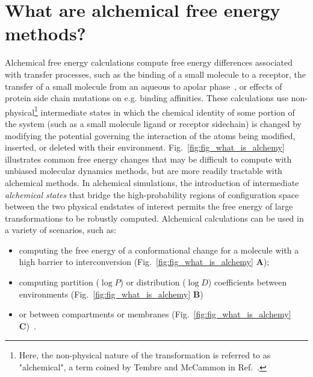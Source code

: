 \documentclass[9pt,bestpractices]{livecoms}
\begin{document}
\section{What are alchemical free energy methods?}
\label{sec:intro}
Alchemical free energy calculations compute free energy differences associated with transfer processes, such as the binding of a small molecule to a receptor, the transfer of a small molecule from an aqueous to apolar phase~\cite{zwanzig1954hightemperature}, or effects of protein side chain mutations on e.g. binding affinities. 
These calculations use non-physical\footnote{Here, the non-physical nature of the transformation is referred to as "alchemical", a term coined by Tembre and McCammon in Ref.~\cite{tembre1984ligandreceptor}.} intermediate states in which the chemical identity of some portion of the system (such as a small molecule ligand or receptor sidechain) is changed by modifying the potential governing the interaction of the atoms being modified, inserted, or deleted with their environment. 
%
Fig.~\ref{fig:fig_what_is_alchemy} illustrates common free energy changes that may be difficult to compute with unbiased molecular dynamics methods, but are more readily tractable with alchemical methods.
In alchemical simulations, the introduction of intermediate \textit{alchemical states} that bridge the high-probability regions of configuration space between the two physical endstates of interest permits the free energy of large transformations to be robustly computed.
Alchemical calculations can be used in a variety of scenarios, such as: 
\begin{itemize}
\item computing the free energy of a conformational change for a molecule with a high barrier to interconversion (Fig.~\ref{fig:fig_what_is_alchemy} \textbf{A});
\item computing partition ($\log P$) or distribution ($\log D$) coefficients between environments (Fig.~\ref{fig:fig_what_is_alchemy} \textbf{B})~\cite{rustenburg2016measuring, bosisio2016blinded} 
\item or between compartments or membranes (Fig.~\ref{fig:fig_what_is_alchemy} \textbf{C})~\cite{corey2019insights}. 
\end{itemize}
\end{document}
